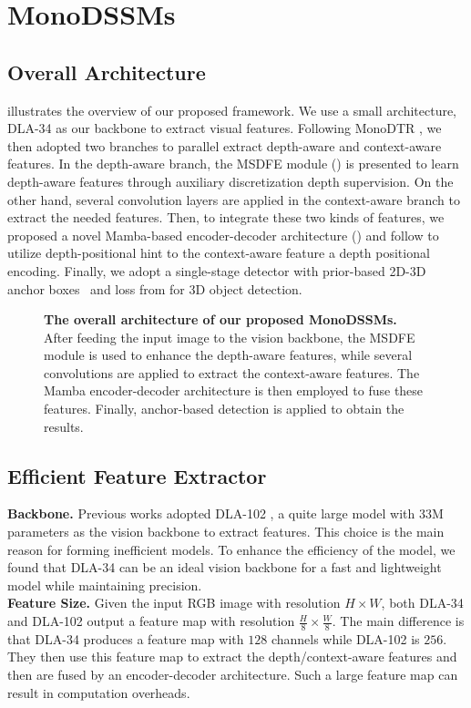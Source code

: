\section{MonoDSSMs}
\subsection{Overall Architecture}
 illustrates the overview of our proposed framework. We use a small architecture, DLA-34 \cite{DLA} as our backbone to extract visual features. Following MonoDTR \cite{MonoDTR}, we then adopted two branches to parallel extract depth-aware and context-aware features. In the depth-aware branch, the MSDFE module () is presented to learn depth-aware features through auxiliary discretization depth supervision. On the other hand, several convolution layers are applied in the context-aware branch to extract the needed features. Then, to integrate these two kinds of features, we proposed a novel Mamba-based encoder-decoder architecture () and follow \cite{MonoDTR} to utilize depth-positional hint to the context-aware feature a depth positional encoding. Finally, we adopt a single-stage detector with prior-based 2D-3D anchor boxes~\cite{YOLO} and loss from \cite{MonoDTR} for 3D object detection.
\begin{figure}[h!]
    \centering
    
    \caption{\textbf{The overall architecture of our proposed MonoDSSMs.} After feeding the input image to the vision backbone, the MSDFE module is used to enhance the depth-aware features, while several convolutions are applied to extract the context-aware features. The Mamba encoder-decoder architecture is then employed to fuse these features. Finally, anchor-based detection is applied to obtain the results.}
    \label{fig:MonoDSSMs_arch}
\end{figure}

\subsection{Efficient Feature Extractor} \label{sec:5.2.2}
\textbf{Backbone.} Previous works \cite{MonoDTR} adopted DLA-102 \cite{DLA}, a quite large model with 33M parameters as the vision backbone to extract features. This choice is the main reason for forming inefficient models. To enhance the efficiency of the model, we found that DLA-34 \cite{DLA} can be an ideal vision backbone for a fast and lightweight model while maintaining precision.\\
\textbf{Feature Size.} Given the input RGB image with resolution $H\times W$, both DLA-34 and DLA-102 output a feature map with resolution $\frac{H}{8}\times \frac{W}{8}$. The main difference is that DLA-34 produces a feature map with $128$ channels while DLA-102 is $256$. They then use this feature map to extract the depth/context-aware features and then are fused by an encoder-decoder architecture. Such a large feature map can result in computation overheads.


